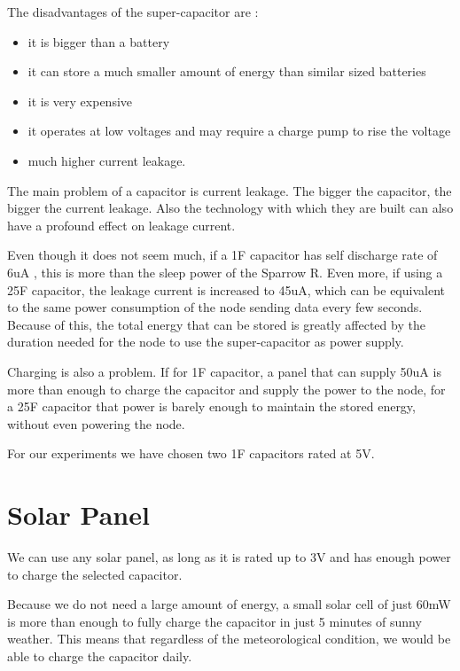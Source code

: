 The disadvantages of the super-capacitor are :

\begin{itemize}
\item it is bigger than a battery
\item it can store a much smaller amount of energy than similar sized batteries
\item it is very expensive
\item it operates at low voltages and may require a charge pump to rise the voltage
\item much higher current leakage.

\end{itemize}

The main problem of a capacitor is current leakage. The bigger the capacitor, the bigger the
current leakage. Also the technology with which they are built can also have a profound effect on
leakage current.

Even though it does not seem much, if a 1F capacitor has self discharge rate of 6uA
\cite{ultracap}, this is more than the sleep power of the Sparrow R. Even more, if using a 25F
capacitor, the leakage current is increased to 45uA, which can be equivalent to the same power
consumption of the node sending data every few seconds. Because of this, the total energy that can
be stored is greatly affected by the duration needed for the node to use the super-capacitor as
power supply.

Charging is also a problem. If for 1F capacitor, a panel that can supply 50uA is more than enough to charge
the capacitor and supply the power to the node, for a 25F capacitor that power is barely enough
to maintain the stored energy, without even powering the node.

For our experiments we have chosen two 1F capacitors rated at 5V.

\section{Solar Panel}

We can use any solar panel, as long as it is rated up to 3V and has enough power to charge the
selected capacitor.

Because we do not need a large amount of energy, a small solar cell of just 60mW is more than
enough to fully charge the capacitor in just 5 minutes of sunny weather. This means that regardless
of the meteorological condition, we would be able to charge the capacitor daily.

